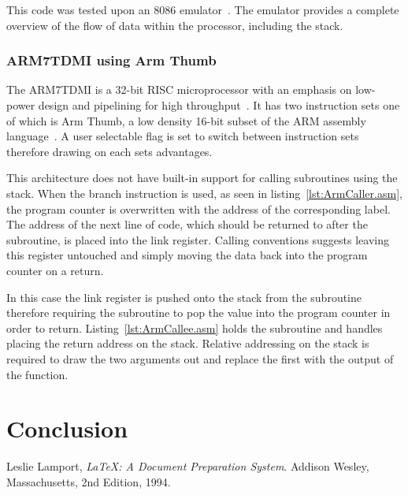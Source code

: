 \documentclass[12pt,a4paper]{article}
\begin{document}
This code was tested upon an 8086 emulator~\cite{emu8086}.
The emulator provides a complete overview of the flow of data within the processor, including the stack. 




\subsubsection{ARM7TDMI using Arm Thumb}
The ARM7TDMI is a 32-bit RISC microprocessor with an emphasis on low-power design and pipelining for high throughput~\cite{ARM7TDMI}.
It has two instruction sets one of which is Arm Thumb, a low density 16-bit subset of the ARM assembly language~\cite{arm}.
A user selectable flag is set to switch between instruction sets therefore drawing on each sets advantages.

This architecture does not have built-in support for calling subroutines using the stack.
When the branch instruction is used, as seen in listing~\ref{lst:ArmCaller.asm}, the program counter is overwritten with the address of the corresponding label.
The address of the next line of code, which should be returned to after the subroutine, is placed into the link register.
Calling conventions suggests leaving this register untouched and simply moving the data back into the program counter on a return.


In this case the link register is pushed onto the stack from the subroutine therefore requiring the subroutine to pop the value into the program counter in order to return.
Listing~\ref{lst:ArmCallee.asm} holds the subroutine and handles placing the return address on the stack.
Relative addressing on the stack is required to draw the two arguments out and replace the first with the output of the function.







\section{Conclusion}






\renewcommand{\refname}{Bibliography}
\begin{thebibliography}{9}

  Leslie Lamport,
  \emph{\LaTeX: A Document Preparation System}.
  Addison Wesley, Massachusetts,
  2nd Edition,
  1994.

\end{thebibliography}
\end{document}
